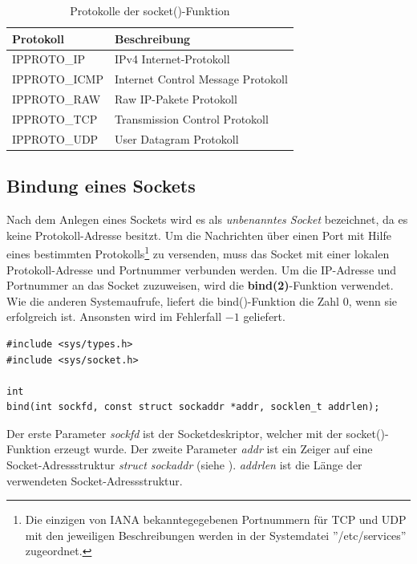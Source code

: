 \begin{table}[htbp]
	\centering
	\begin{tabular}{|l|l|}\hline
	   Protokoll & Beschreibung \\ \hline \hline
	   IPPROTO\_IP & IPv4 Internet-Protokoll \\ \hline
	   IPPROTO\_ICMP & Internet Control Message Protokoll \\ \hline
	   IPPROTO\_RAW & Raw IP-Pakete Protokoll \\ \hline
	   IPPROTO\_TCP &  Transmission Control Protokoll \\ \hline
	   IPPROTO\_UDP & User Datagram Protokoll \\ \hline
	 \end{tabular}
	 \caption[Protokolle der socket()-Funktion]{Protokolle der socket()-Funktion}\label{socket:protocol}
\end{table}

\subsection{Bindung eines Sockets}

Nach dem Anlegen eines Sockets wird es als \textit{unbenanntes Socket} bezeichnet, da es keine Protokoll-Adresse besitzt. Um die Nachrichten über einen Port mit Hilfe eines bestimmten Protokolls\footnote{Die einzigen von IANA bekanntegegebenen Portnummern für TCP und UDP mit den jeweiligen Beschreibungen werden in der Systemdatei ''/etc/services'' zugeordnet.} zu versenden, muss das Socket mit einer lokalen Protokoll-Adresse und Portnummer verbunden werden. Um die IP-Adresse und Portnummer an das Socket zuzuweisen, wird die \textbf{bind(2)}-Funktion verwendet. Wie die anderen Systemaufrufe, liefert die bind()-Funktion die Zahl $0$, wenn sie erfolgreich ist. Ansonsten wird im Fehlerfall $-1$ geliefert. \smallskip \smallskip

\begin{verbatim}
#include <sys/types.h>
#include <sys/socket.h>

int
bind(int sockfd, const struct sockaddr *addr, socklen_t addrlen);
\end{verbatim}
\smallskip \smallskip

Der erste Parameter \textit{sockfd} ist der Socketdeskriptor, welcher mit der socket()-Funktion erzeugt wurde. Der zweite Parameter \textit{addr} ist ein Zeiger auf eine Socket-Adressstruktur \textit{struct sockaddr} (siehe ). \textit{addrlen} ist die Länge der verwendeten Socket-Adressstruktur.

